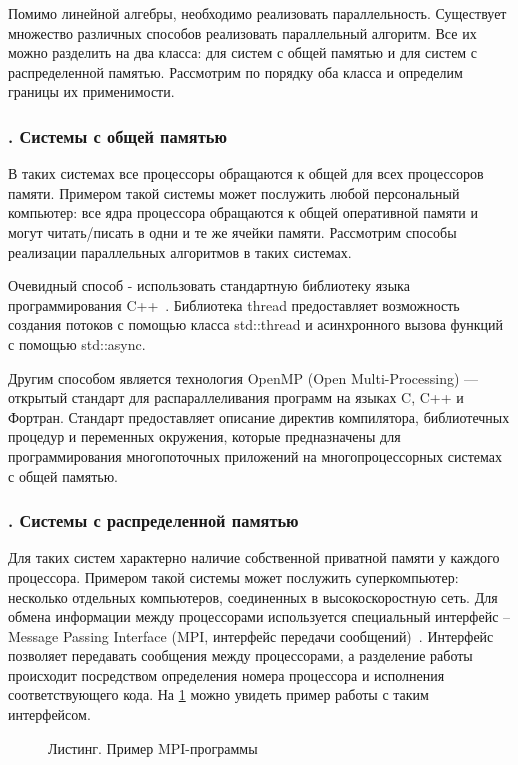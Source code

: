 \documentclass[a4paper,14pt,indentfirst]{extreport}
\newcommand{\EN}[1]{\foreignlanguage{english}{#1}}
\begin{document}
Помимо линейной алгебры, необходимо реализовать параллельность. Существует множество различных способов реализовать параллельный алгоритм. Все их можно разделить на два класса: для систем с общей памятью и для систем с распределенной памятью. Рассмотрим по порядку оба класса и определим границы их применимости. 
\subsubsection*{\thesubsubsection. Системы с общей памятью}
В таких системах все процессоры обращаются к общей для всех процессоров памяти. Примером такой системы может послужить любой персональный компьютер: все ядра процессора обращаются к общей оперативной памяти и могут читать/писать в одни и те же ячейки памяти. Рассмотрим способы реализации параллельных алгоритмов в таких системах.

Очевидный способ - использовать стандартную библиотеку языка программирования C++~\cite{1cpp_base}. Библиотека thread предоставляет возможность создания потоков с помощью класса std::thread и асинхронного вызова функций с помощью std::async.

Другим способом является технология \EN{OpenMP (Open Multi\hyp{}Processing)} — открытый стандарт для распараллеливания программ на языках C, C++ и Фортран\cite{2openmp}. Стандарт предоставляет описание директив компилятора, библиотечных процедур и переменных окружения, которые предназначены для программирования многопоточных приложений на многопроцессорных системах с общей памятью. 
\subsubsection*{\thesubsubsection. Системы с распределенной памятью}
Для таких систем характерно наличие собственной приватной памяти у каждого процессора. Примером такой системы может послужить суперкомпьютер: несколько отдельных компьютеров, соединенных в высокоскоростную сеть. Для обмена информации между процессорами используется специальный интерфейс -- \EN{Message Passing Interface} (MPI, интерфейс передачи сообщений)~\cite{2mpi}. Интерфейс позволяет передавать сообщения между процессорами, а разделение работы происходит посредством определения номера процессора и исполнения соответствующего кода. На \cref{mpi_sample} можно увидеть пример работы с таким интерфейсом.

\begin{figure}[h]
  
  \caption{Листинг. Пример MPI-программы}
  \label{mpi_sample}
\end{figure}
\end{document}
